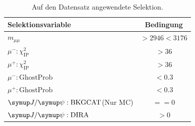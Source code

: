 \begin{table}[htb]
  \centering
  \caption{Auf den Datensatz angewendete Selektion.}
  \begin{tabular}{lc}
    \toprule
    Selektionsvariable                & Bedingung      \\
    \midrule
    $m_{\mu\mu}$                       & $>\num{2946}<\num{3176}$  \\
    $\mu^{-}:\chi_{\text{IP}}^2$      & $>\num{36}$  \\
    $\mu^{+}:\chi_{\text{IP}}^2$      & $>\num{36}$  \\
    $\mu^{-}:\text{GhostProb}$        & $<\num{0.3}$ \\
    $\mu^{+}:\text{GhostProb}$        & $<\num{0.3}$ \\
    $\jpsi:\text{BKGCAT}$(Nur MC)     & $==\num{0}$  \\
    $\jpsi:\text{DIRA}$               & $>\num{0}$  \\
    \bottomrule
  \end{tabular}
  \label{tab:strip}
\end{table}

